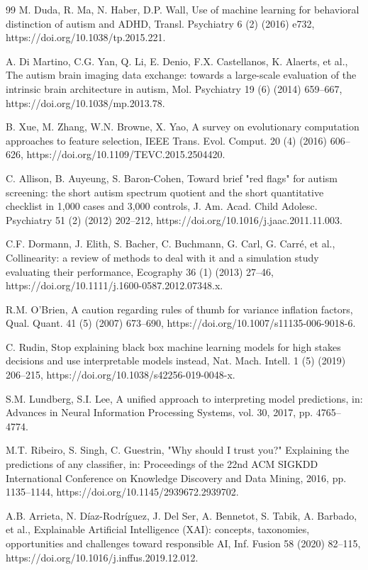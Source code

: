 \documentclass[pdflatex,sn-vancouver-num]{sn-jnl}
\begin{document}
\begin{thebibliography}{99}
M. Duda, R. Ma, N. Haber, D.P. Wall, Use of machine learning for behavioral distinction of autism and ADHD, Transl. Psychiatry 6 (2) (2016) e732, https://doi.org/10.1038/tp.2015.221.

A. Di Martino, C.G. Yan, Q. Li, E. Denio, F.X. Castellanos, K. Alaerts, et al., The autism brain imaging data exchange: towards a large-scale evaluation of the intrinsic brain architecture in autism, Mol. Psychiatry 19 (6) (2014) 659--667, https://doi.org/10.1038/mp.2013.78.

B. Xue, M. Zhang, W.N. Browne, X. Yao, A survey on evolutionary computation approaches to feature selection, IEEE Trans. Evol. Comput. 20 (4) (2016) 606--626, https://doi.org/10.1109/TEVC.2015.2504420.

C. Allison, B. Auyeung, S. Baron-Cohen, Toward brief "red flags" for autism screening: the short autism spectrum quotient and the short quantitative checklist in 1,000 cases and 3,000 controls, J. Am. Acad. Child Adolesc. Psychiatry 51 (2) (2012) 202--212, https://doi.org/10.1016/j.jaac.2011.11.003.

C.F. Dormann, J. Elith, S. Bacher, C. Buchmann, G. Carl, G. Carré, et al., Collinearity: a review of methods to deal with it and a simulation study evaluating their performance, Ecography 36 (1) (2013) 27--46, https://doi.org/10.1111/j.1600-0587.2012.07348.x.

R.M. O'Brien, A caution regarding rules of thumb for variance inflation factors, Qual. Quant. 41 (5) (2007) 673--690, https://doi.org/10.1007/s11135-006-9018-6.

C. Rudin, Stop explaining black box machine learning models for high stakes decisions and use interpretable models instead, Nat. Mach. Intell. 1 (5) (2019) 206--215, https://doi.org/10.1038/s42256-019-0048-x.

S.M. Lundberg, S.I. Lee, A unified approach to interpreting model predictions, in: Advances in Neural Information Processing Systems, vol. 30, 2017, pp. 4765--4774.

M.T. Ribeiro, S. Singh, C. Guestrin, "Why should I trust you?" Explaining the predictions of any classifier, in: Proceedings of the 22nd ACM SIGKDD International Conference on Knowledge Discovery and Data Mining, 2016, pp. 1135--1144, https://doi.org/10.1145/2939672.2939702.

A.B. Arrieta, N. Díaz-Rodríguez, J. Del Ser, A. Bennetot, S. Tabik, A. Barbado, et al., Explainable Artificial Intelligence (XAI): concepts, taxonomies, opportunities and challenges toward responsible AI, Inf. Fusion 58 (2020) 82--115, https://doi.org/10.1016/j.inffus.2019.12.012.


\end{thebibliography}
\end{document}
